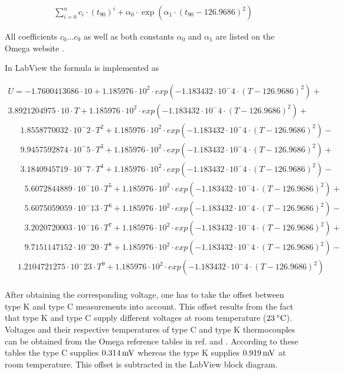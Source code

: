 \documentclass[parskip,12pt,headsepline,a4paper] {scrbook}
\begin{document}
\begin{align}  \label{direct-polynomial}
\sum\limits_{i=0}^n c_i \cdot (t_{90})^i + \alpha_0 \cdot \exp(\alpha_1 \cdot (t_{90} - 126.9686)^2)
\end{align}

All coefficients $c_0$...$c_9$ as well as both constants $\alpha_0$ and $\alpha_1$ are listed on the Omega website \cite{omega-polynomials}.

In LabView the formula is implemented as

\begin{multline}  \label{implemented-polynomial}
U = -1.7600413686 \cdot 10 + 1.185976 \cdot 10^2 \cdot exp(-1.183432 \cdot 10^-4 \cdot (T-126.9686)^2) + \\
    3.8921204975 \cdot 10 \cdot T + 1.185976 \cdot 10^2 \cdot exp(-1.183432 \cdot 10^-4 \cdot (T-126.9686)^2) + \\
    \quad \,\,\,1.8558770032 \cdot 10^-2 \cdot T^2 + 1.185976 \cdot 10^2 \cdot exp(-1.183432 \cdot 10^-4 \cdot (T-126.9686)^2) - \\
    \quad \,\,\,9.9457592874 \cdot 10^-5 \cdot T^3 + 1.185976 \cdot 10^2 \cdot exp(-1.183432 \cdot 10^-4 \cdot (T-126.9686)^2) + \\
    \quad \,\,\,3.1840945719 \cdot 10^-7 \cdot T^4 + 1.185976 \cdot 10^2 \cdot exp(-1.183432 \cdot 10^-4 \cdot (T-126.9686)^2) - \\
    \quad \quad5.6072844889 \cdot 10^-10 \cdot T^5 + 1.185976 \cdot 10^2 \cdot exp(-1.183432 \cdot 10^-4 \cdot (T-126.9686)^2) + \\
    \quad \quad5.6075059059 \cdot 10^-13 \cdot T^6 + 1.185976 \cdot 10^2 \cdot exp(-1.183432 \cdot 10^-4 \cdot (T-126.9686)^2) - \\
    \quad \quad3.2020720003 \cdot 10^-16 \cdot T^7 + 1.185976 \cdot 10^2 \cdot exp(-1.183432 \cdot 10^-4 \cdot (T-126.9686)^2) + \\
    \quad \quad9.7151147152 \cdot 10^-20 \cdot T^8 + 1.185976 \cdot 10^2 \cdot exp(-1.183432 \cdot 10^-4 \cdot (T-126.9686)^2) - \\
    \quad \,1.2104721275 \cdot 10^-23 \cdot T^9 + 1.185976 \cdot 10^2 \cdot exp(-1.183432 \cdot 10^-4 \cdot (T-126.9686)^2) \\
\end{multline}

After obtaining the corresponding voltage, one has to take the offset between type K and type C measurements into account. This offset results from the fact that type K and type C supply different voltages at room temperature ($\unit[23]{^\circ C}$). Voltages and their respective temperatures of type C and type K thermocouples can be obtained from the Omega reference tables in ref. \cite{ref-typec} and \cite{ref-typek}. According to these tables the type C supplies $\unit[0.314]{mV}$ whereas the type K supplies $\unit[0.919]{mV}$ at room temperature. This offset is subtracted in the LabView block diagram.
\end{document}
